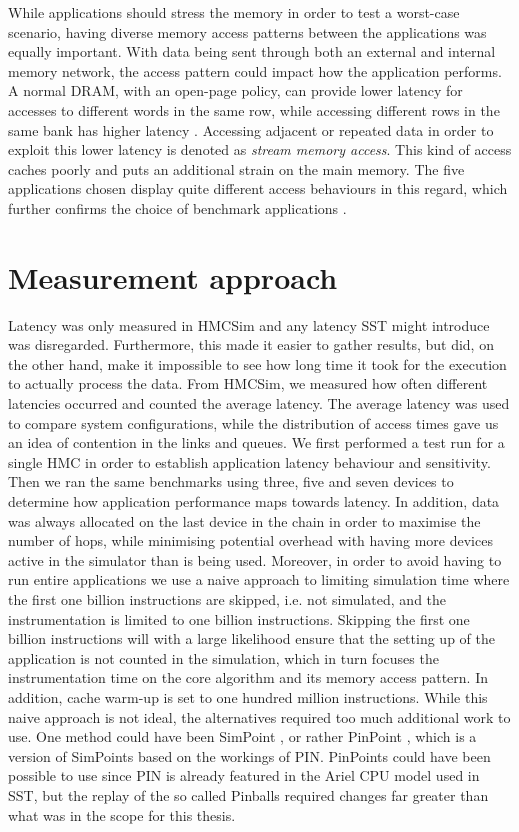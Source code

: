 While applications should stress the memory in order to test a worst-case scenario, having diverse memory access patterns between the applications was equally important. With data being sent through both an external and internal memory network, the access pattern could impact how the application performs. A normal DRAM, with an open-page policy, can provide lower latency for accesses to different words in the same row, while accessing different rows in the same bank has higher latency \cite{10.1145/342001.339668}. Accessing adjacent or repeated data in order to exploit this lower latency is denoted as \emph{stream memory access}. This kind of access caches poorly and puts an additional strain on the main memory. The five applications chosen display quite different access behaviours in this regard, which further confirms the choice of benchmark applications \cite{10.1145/3307650.3322229, song2018experiments}.


\section{Measurement approach}
Latency was only measured in HMCSim and any latency SST might introduce was disregarded. Furthermore, this made it easier to gather results, but did, on the other hand, make it impossible to see how long time it took for the execution to actually process the data. From HMCSim, we measured how often different latencies occurred and counted the average latency. The average latency was used to compare system configurations, while the distribution of access times gave us an idea of contention in the links and queues. We first performed a test run for a single HMC in order to establish application latency behaviour and sensitivity. Then we ran the same benchmarks using three, five and seven devices to determine how application performance maps towards latency. In addition, data was always allocated on the last device in the chain in order to maximise the number of hops, while minimising potential overhead with having more devices active in the simulator than is being used. Moreover, in order to avoid having to run entire applications we use a naive approach to limiting simulation time where the first one billion instructions are skipped, i.e. not simulated, and the instrumentation is limited to one billion instructions. Skipping the first one billion instructions will with a large likelihood ensure that the setting up of the application is not counted in the simulation, which in turn focuses the instrumentation time on the core algorithm and its memory access pattern. In addition, cache warm-up is set to one hundred million instructions. While this naive approach is not ideal, the alternatives required too much additional work to use. One method could have been SimPoint \cite{hamerly2005simpoint}, or rather PinPoint \cite{pinplay2010patil}, which is a version of SimPoints based on the workings of PIN. PinPoints could have been possible to use since PIN is already featured in the Ariel CPU model used in SST, but the replay of the so called Pinballs required changes far greater than what was in the scope for this thesis.
\bigskip

